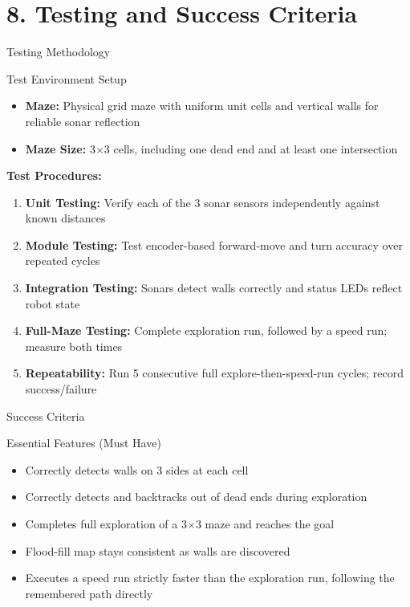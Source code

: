 \documentclass[aspectratio=169,11pt]{beamer}
\begin{document}
\section{8. Testing and Success Criteria}
\begin{frame}{Testing Methodology}
    \small
    \begin{block}{Test Environment Setup}
        \small
        \begin{itemize}\setlength{\itemsep}{0pt}
            \item \textbf{Maze:} Physical grid maze with uniform unit cells and vertical walls for reliable sonar reflection
            \item \textbf{Maze Size:} 3$\times$3 cells, including one dead end and at least one intersection
        \end{itemize}
    \end{block}

    \vspace{0.1cm}
    \textbf{Test Procedures:}
    \begin{enumerate}\setlength{\itemsep}{0pt}
        \item \textbf{Unit Testing:} Verify each of the 3 sonar sensors independently against known distances
        \item \textbf{Module Testing:} Test encoder-based forward-move and turn accuracy over repeated cycles
        \item \textbf{Integration Testing:} Sonars detect walls correctly and status LEDs reflect robot state
        \item \textbf{Full-Maze Testing:} Complete exploration run, followed by a speed run; measure both times
        \item \textbf{Repeatability:} Run 5 consecutive full explore-then-speed-run cycles; record success/failure
    \end{enumerate}
\end{frame}

\begin{frame}{Success Criteria}
    \vspace{0.3cm}
    \begin{block}{Essential Features (Must Have)}
        \begin{itemize}\setlength{\itemsep}{4pt}
            \item[$\checkmark$] Correctly detects walls on 3 sides at each cell
            \item[$\checkmark$] Correctly detects and backtracks out of dead ends during exploration
            \item[$\checkmark$] Completes full exploration of a 3$\times$3 maze and reaches the goal
            \item[$\checkmark$] Flood-fill map stays consistent as walls are discovered
            \item[$\checkmark$] Executes a speed run strictly faster than the exploration run, following the remembered path directly
        \end{itemize}
    \end{block}
\end{frame}
\end{document}
